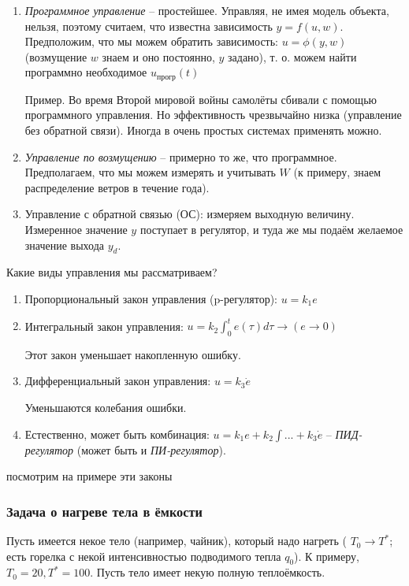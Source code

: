 \documentclass[main.tex]{subfiles}
\begin{document}
\begin{enumerate}[noitemsep]
	\item \emph{Программное управление} -- простейшее. Управляя, не имея модель объекта, нельзя, поэтому считаем, что известна зависимость $ y = f(u, w) $. Предположим, что мы можем обратить зависимость: $ u = \phi(y, w) $ (возмущение $ w $ знаем и оно постоянно, $ y $ задано), т. о. можем найти программно необходимое $ u_{\text{прогр}}(t) $
	
	Пример.
	Во время Второй мировой войны самолёты сбивали с помощью программного управления.
	Но эффективность чрезвычайно низка (управление без обратной связи).
	Иногда в очень простых системах применять можно.
	\item \emph{Управление по возмущению} -- примерно то же, что программное.
	Предполагаем, что мы можем измерять и учитывать $ W $ (к примеру, знаем распределение ветров в течение года).
	\item Управление с обратной связью (ОС): измеряем выходную величину. Измеренное значение $ y $ поступает в регулятор, и туда же мы подаём желаемое значение выхода $ y_d $.
\end{enumerate}

Какие виды управления мы рассматриваем?

\begin{enumerate}[noitemsep]
	\item Пропорциональный закон управления (p-регулятор): $ u = k_1 e $
	\item Интегральный закон управления: $ u = k_2 \int_{0}^{t} e(\tau)d\tau \longrightarrow (e  \to 0) $ 
	
	Этот закон уменьшает накопленную ошибку.
	\item Дифференциальный закон управления: $ u = k_3 \dot e $
	
	Уменьшаются колебания ошибки.
	
	\item Естественно, может быть комбинация: $ u = k_1e + k_2 \int... + k_3 \dot e $ -- \emph{ПИД-регулятор} (может быть и \emph{ПИ-регулятор}).
\end{enumerate}

посмотрим на примере эти законы

\subsubsection{Задача о нагреве тела в ёмкости}

Пусть имеется некое тело (например, чайник), который надо нагреть ( $T_0 \to T^*$; есть горелка с некой интенсивностью подводимого тепла $ q_0 $).
К примеру, $ T_0=20, T^*=100 $. Пусть тело имеет некую полную теплоёмкость.
\end{document}

